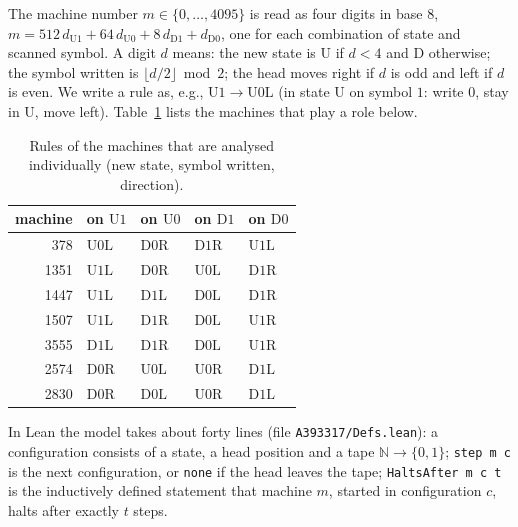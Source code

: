 \documentclass[11pt,a4paper]{amsart}
\theoremstyle{definition}
\theoremstyle{remark}
\newcommand{\N}{\mathbb{N}}
\newcommand{\U}{\mathrm{U}}
\newcommand{\D}{\mathrm{D}}
\newcommand{\lean}[1]{\texttt{#1}}
\begin{document}
The machine number $m\in\{0,\dots,4095\}$ is read as four digits in base $8$,
$m=512\,d_{\U1}+64\,d_{\U0}+8\,d_{\D1}+d_{\D0}$, one for each combination of state and scanned symbol. A digit
$d$ means: the new state is $\U$ if $d<4$ and $\D$ otherwise; the symbol written is $\lfloor d/2\rfloor \bmod 2$;
the head moves right if $d$ is odd and left if $d$ is even. We write a rule as, e.g., $\U1\to\U0\mathrm{L}$
(in state $\U$ on symbol $1$: write $0$, stay in $\U$, move left). Table~\ref{tab:rules} lists the machines
that play a role below.

\begin{table}[h]
\centering\small
\begin{tabular}{rllll}
\toprule
machine & on $\U1$ & on $\U0$ & on $\D1$ & on $\D0$\\
\midrule
378  & $\U0\mathrm{L}$ & $\D0\mathrm{R}$ & $\D1\mathrm{R}$ & $\U1\mathrm{L}$\\
1351 & $\U1\mathrm{L}$ & $\D0\mathrm{R}$ & $\U0\mathrm{L}$ & $\D1\mathrm{R}$\\
1447 & $\U1\mathrm{L}$ & $\D1\mathrm{L}$ & $\D0\mathrm{L}$ & $\D1\mathrm{R}$\\
\midrule
1507 & $\U1\mathrm{L}$ & $\D1\mathrm{R}$ & $\D0\mathrm{L}$ & $\U1\mathrm{R}$\\
3555 & $\D1\mathrm{L}$ & $\D1\mathrm{R}$ & $\D0\mathrm{L}$ & $\U1\mathrm{R}$\\
2574 & $\D0\mathrm{R}$ & $\U0\mathrm{L}$ & $\U0\mathrm{R}$ & $\D1\mathrm{L}$\\
2830 & $\D0\mathrm{R}$ & $\D0\mathrm{L}$ & $\U0\mathrm{R}$ & $\D1\mathrm{L}$\\
\bottomrule
\end{tabular}
\caption{Rules of the machines that are analysed individually (new state, symbol written, direction).}
\label{tab:rules}
\end{table}

In Lean the model takes about forty lines (file \lean{A393317/Defs.lean}): a configuration consists of a
state, a head position and a tape $\N\to\{0,1\}$; \lean{step m c} is the next configuration, or \lean{none}
if the head leaves the tape; \lean{HaltsAfter m c t} is the inductively defined statement that machine $m$,
started in configuration $c$, halts after exactly $t$ steps.
\end{document}
